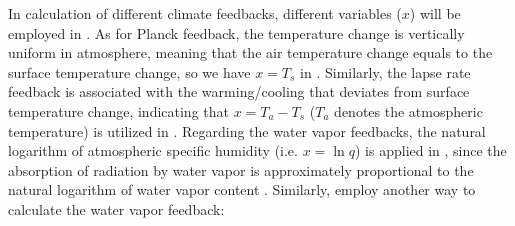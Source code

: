 In calculation of different climate feedbacks, different variables ($x$) will be employed in . As for Planck feedback, the temperature change is vertically uniform in atmosphere, meaning that the air temperature change equals to the surface temperature change, so we have $x=T_s$ in . Similarly, the lapse rate feedback is associated with the warming/cooling that deviates from surface temperature change, indicating that $x=T_a-T_s$ ($T_a$ denotes the atmospheric temperature) is utilized in .
Regarding the water vapor feedbacks, the natural logarithm of atmospheric specific humidity (i.e. $x=\ln q$) is applied in , since the absorption of radiation by water vapor is approximately proportional to the natural logarithm of water vapor content \citep{Shell2008,Feldl2016,Liu2018}. %
Similarly, \cite{Huang2017} employ another way to calculate the water vapor feedback:

